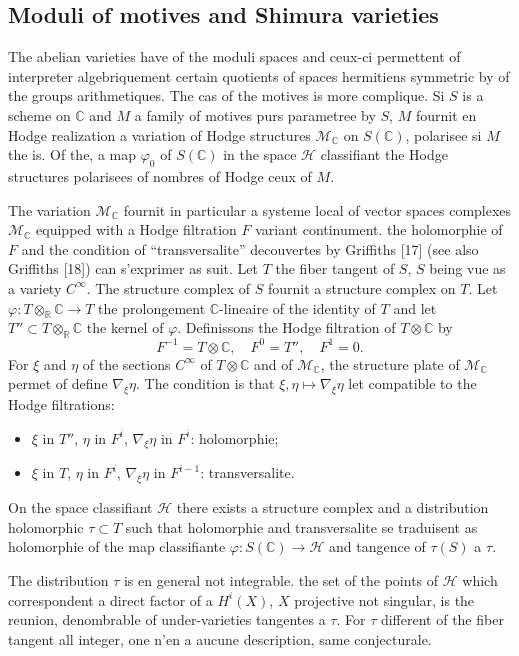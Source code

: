 \documentclass[11pt,a4paper]{article}
\theoremstyle{plain}
\theoremstyle{definition}
\newcommand{\C}{\mathbb{C}}
\newcommand{\R}{\mathbb{R}}
\begin{document}
\subsection{Moduli of motives and Shimura varieties}

The abelian varieties have of the moduli spaces and ceux-ci permettent of interpreter algebriquement certain quotients of spaces hermitiens symmetric by of the groups arithmetiques. The cas of the motives is more complique. Si $S$ is a scheme on $\C$ and $M$ a family of motives purs parametree by $S$, $M$ fournit en Hodge realization a variation of Hodge structures $\mathcal{M}_{\C}$ on $S(\C)$, polarisee si $M$ the is. Of the, a map $\varphi_0$ of $S(\C)$ in the space $\mathscr{H}$ classifiant the Hodge structures polarisees of nombres of Hodge ceux of $M$.

The variation $\mathcal{M}_{\C}$ fournit in particular a systeme local of vector spaces complexes $\mathcal{M}_{\C}$ equipped with a Hodge filtration $F$ variant continument. the holomorphie of $F$ and the condition of ``transversalite'' decouvertes by Griffiths [17] (see also Griffiths [18]) can s'exprimer as suit. Let $T$ the fiber tangent of $S$, $S$ being vue as a variety $C^{\infty}$. The structure complex of $S$ fournit a structure complex on $T$. Let $\varphi: T \otimes_{\R} \C \to T$ the prolongement $\C$-lineaire of the identity of $T$ and let $T'' \subset T \otimes_{\R} \C$ the kernel of $\varphi$. Definissons the Hodge filtration of $T \otimes \C$ by
$$
F^{-1} = T \otimes \C, \quad F^0 = T'', \quad F^1 = 0.
$$
For $\xi$ and $\eta$ of the sections $C^{\infty}$ of $T \otimes \C$ and of $\mathcal{M}_{\C}$, the structure plate of $\mathcal{M}_{\C}$ permet of define $\nabla_{\xi} \eta$. The condition is that $\xi, \eta \mapsto \nabla_{\xi} \eta$ let compatible to the Hodge filtrations:
\begin{itemize}
\item[] $\xi$ in $T''$, $\eta$ in $F^i$, $\nabla_{\xi} \eta$ in $F^i$: holomorphie;
\item[] $\xi$ in $T$, $\eta$ in $F^i$, $\nabla_{\xi} \eta$ in $F^{i-1}$: transversalite.
\end{itemize}

On the space classifiant $\mathscr{H}$ there exists a structure complex and a distribution holomorphic $\tau \subset T$ such that holomorphie and transversalite se traduisent as holomorphie of the map classifiante $\varphi: S(\C) \to \mathscr{H}$ and tangence of $\tau(S)$ a $\tau$.

The distribution $\tau$ is en general not integrable. the set of the points of $\mathscr{H}$ which correspondent a direct factor of a $H^i(X)$, $X$ projective not singular, is the reunion, denombrable of under-varieties tangentes a $\tau$. For $\tau$ different of the fiber tangent all integer, one n'en a aucune description, same conjecturale.
\end{document}
